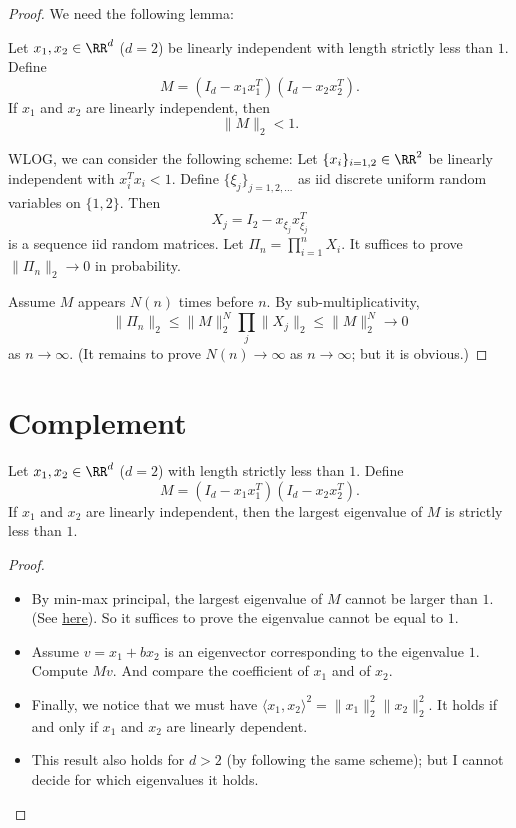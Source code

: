 \begin{enumerate}[a)]
	\begin{proof}
	 	We need the following lemma:
	 	\begin{lemma}
	 		Let $x_1, x_2 \in \RR^d$ ($d = 2$) be linearly independent with length strictly less than $1$. Define $$M = (I_d - x_1 x_1^T)(I_d - x_2 x_2^T).$$ If $x_1$ and $x_2$ are linearly independent, then
	 		$$\|M\|_2<1.$$
	 	\end{lemma}
 		WLOG, we can consider the following scheme: Let $\{ x_i \}_{i=1,2} \in \RR^2$ be linearly independent with $x_i^T x_i < 1$. Define $\{\xi_j\}_{j=1,2,\dots}$ as iid discrete uniform random variables on $\{1,2 \}$. Then
 		$$X_j =  I_2 - x_{\xi_j} x_{\xi_j}^T $$
 		is a sequence iid random matrices. Let $\Pi_n = \prod_{i=1}^n X_i$. It suffices to prove $\| \Pi_n \|_2 \to 0$ in probability.
 		
 		Assume $M$ appears $N(n)$ times before $n$. By sub-multiplicativity,
 		$$\| \Pi_n \|_2 \leq \| M \|_2^N \prod_j \|  X_j \|_2 \leq \| M \|_2^N \to 0$$
 		as $n\to \infty$. (It remains to prove $N(n) \to \infty$ as $n\to \infty$; but it is obvious.)
	\end{proof}
\end{enumerate}
 
 
\section*{Complement}
\begin{example}
	Let $x_1, x_2 \in \RR^d$ ($d = 2$) with length strictly less than $1$. Define $$M = (I_d - x_1 x_1^T)(I_d - x_2 x_2^T).$$ If $x_1$ and $x_2$ are linearly independent, then the largest eigenvalue of $M$ is strictly less than $1$.
	
	\begin{proof}
		\begin{itemize}
			\item By min-max principal, the largest eigenvalue of $M$ cannot be larger than $1$. (See \href{https://mathoverflow.net/questions/106191/eigenvalues-of-the-product-of-two-symmetric-matrices/106199#106199}{here}). So it suffices to prove the eigenvalue cannot be equal to $1$.
			
			\item Assume $v = x_1 + b x_2$ is an eigenvector corresponding to the eigenvalue $1$. Compute $Mv$. And compare the coefficient of $x_1$ and of $x_2$.
			
			\item Finally, we notice that we must have $\langle x_1, x_2 \rangle^2 = \| x_1\|_2^2 \|x_2 \|_2^2$. It holds if and only if $x_1$ and $x_2$ are linearly dependent. 
			
			\item This result also holds for $d>2$ (by following the same scheme); but I cannot decide for which eigenvalues it holds.
		\end{itemize}
	\end{proof}
\end{example}

